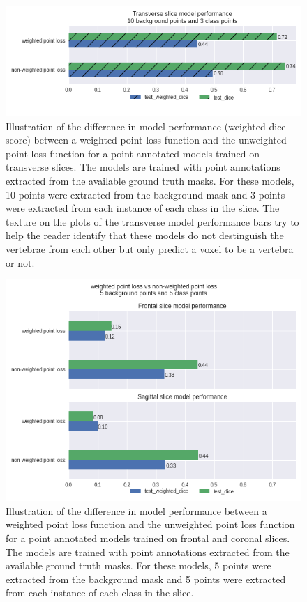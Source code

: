 \begin{samepage}
\begin{figure}
    \centering
    \includegraphics[width=.95\textwidth]{images/weightedvsnonweighted_transverse.png}
    \caption{
        Illustration of the difference in model performance (weighted dice score) between a weighted point loss function and the unweighted point loss function for a point annotated models trained on transverse slices.
        The models are trained with point annotations extracted from the available ground truth masks. For these models, 
        10 points were extracted from the background mask and 3 points were extracted from each instance of each class in the slice. 
        The texture on the plots of the transverse model performance bars try to help the reader identify that these models do not destinguish the vertebrae from each other but only predict a voxel to be a vertebra or not.
    \label{fig:weighted_vs_unweighted_transverse}}
\end{figure}\nopagebreak
\begin{figure}
    \centering
    \includegraphics[width=.95\textwidth]{images/weightedvsnonweighted.png}
    \caption{
        Illustration of the difference in model performance between a weighted point loss function and the unweighted point loss function for a point annotated models trained on frontal and coronal slices.
        The models are trained with point annotations extracted from the available ground truth masks. For these models, 
        5 points were extracted from the background mask and 5 points were extracted from each instance of each class in the slice. 
        \label{fig:weighted_vs_unweighted}}
\end{figure}
\end{samepage}
